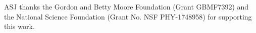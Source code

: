 ASJ thanks the Gordon and Betty Moore Foundation (Grant GBMF7392) and the National Science Foundation (Grant No. NSF PHY-1748958) for supporting this work.

